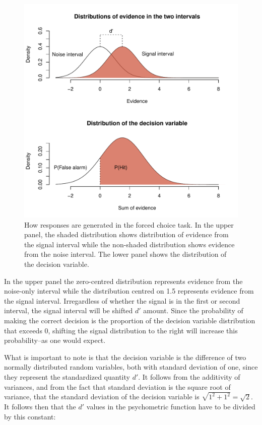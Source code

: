 \documentclass{article}\usepackage{knitr}
\begin{document}
\begin{figure}[!htb]
\centering
\begin{knitrout}
\color{fgcolor}
\includegraphics[width=\maxwidth]{figure/unnamed-chunk-6-1} 

\end{knitrout}
\caption{How responses are generated in the forced choice task. In the upper panel, the shaded distribution shows distribution of evidence from the signal interval while the non-shaded distribution shows evidence from the noise interval. The lower panel shows the distribution of the decision variable. }
\label{fig:2AFC}
\end{figure}

In the upper panel the zero-centred distribution represents evidence from the noise-only interval while the distribution centred on 1.5 represents evidence from the signal interval. Irregardless of whether the signal is in the first or second interval, the signal interval will be shifted $d'$ amount. Since the probability of making the correct decision is the proportion of the decision variable distribution that exceeds 0, shifting the signal distribution to the right will increase this probability--as one would expect.

What is important to note is that the decision variable is the difference of two normally distributed random variables, both with standard  deviation of one, since they represent the standardized quantity $d'$. It follows from the additivity of variances, and from the fact that standard deviation is the square root of variance, that the standard deviation of the decision variable is $\sqrt{1^2 + 1^2} = \sqrt{2}$. It follows then that the $d'$ values in the psychometric function have to be divided by this constant:
\end{document}
